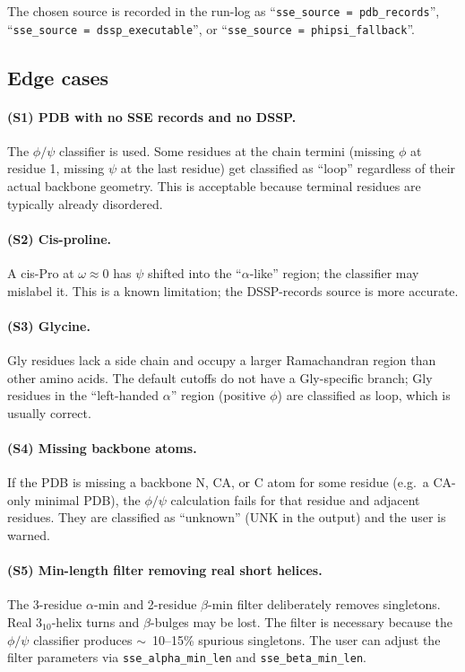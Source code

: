 \documentclass[10pt,a4paper,twoside]{article}
\newcommand{\cfgkey}[1]{\texttt{#1}}
\begin{document}
The chosen source is recorded in the run-log as
``\texttt{sse\_source = pdb\_records}'', ``\texttt{sse\_source =
dssp\_executable}'', or ``\texttt{sse\_source = phipsi\_fallback}''.

\subsection{Edge cases}

\paragraph{(S1) PDB with no SSE records and no DSSP.}
The $\phi/\psi$ classifier is used. Some residues at the chain
termini (missing $\phi$ at residue 1, missing $\psi$ at the last
residue) get classified as ``loop'' regardless of their actual
backbone geometry. This is acceptable because terminal residues
are typically already disordered.

\paragraph{(S2) Cis-proline.}
A cis-Pro at $\omega \approx 0$ has $\psi$ shifted into the
``$\alpha$-like'' region; the classifier may mislabel it. This is
a known limitation; the DSSP-records source is more accurate.

\paragraph{(S3) Glycine.}
Gly residues lack a side chain and occupy a larger Ramachandran
region than other amino acids. The default cutoffs do not have a
Gly-specific branch; Gly residues in the ``left-handed
$\alpha$'' region (positive $\phi$) are classified as loop, which
is usually correct.

\paragraph{(S4) Missing backbone atoms.}
If the PDB is missing a backbone N, CA, or C atom for some
residue (e.g.\ a CA-only minimal PDB), the $\phi/\psi$ calculation
fails for that residue and adjacent residues. They are classified
as ``unknown'' (UNK in the output) and the user is warned.

\paragraph{(S5) Min-length filter removing real short helices.}
The 3-residue $\alpha$-min and 2-residue $\beta$-min filter
deliberately removes singletons. Real 3$_{10}$-helix turns and
$\beta$-bulges may be lost. The filter is necessary because the
$\phi/\psi$ classifier produces $\sim$~10--15\% spurious singletons.
The user can adjust the filter parameters via
\cfgkey{sse\_alpha\_min\_len} and \cfgkey{sse\_beta\_min\_len}.
\end{document}
